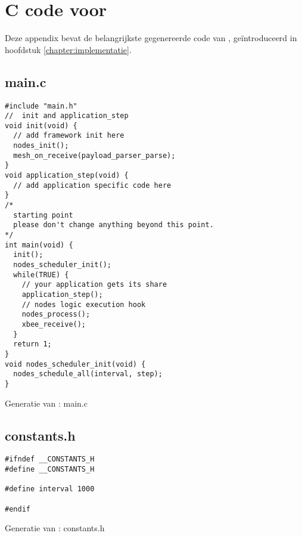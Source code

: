 
\chapter{C code voor }
\label{appendix:hello-srcs}

Deze appendix bevat de belangrijkste gegenereerde code van ,
ge\"introduceerd in hoofdstuk \ref{chapter:implementatie}.

\section{main.c}
\vspace{-5mm}
\begin{listing}[H]
  \begin{verbatim}
#include "main.h"
//  init and application_step
void init(void) {
  // add framework init here
  nodes_init();
  mesh_on_receive(payload_parser_parse);
}
void application_step(void) {
  // add application specific code here
}
/*
  starting point
  please don't change anything beyond this point.
*/
int main(void) {
  init();
  nodes_scheduler_init();
  while(TRUE) {
    // your application gets its share
    application_step();
    // nodes logic execution hook
    nodes_process();
    xbee_receive();
  }
  return 1;
}
void nodes_scheduler_init(void) {
  nodes_schedule_all(interval, step);
}
  \end{verbatim}
  \vspace{-5mm}
  \caption{Generatie van : main.c}
\end{listing}

\section{constants.h}
\vspace{-5mm}
\begin{listing}[H]
  \begin{verbatim}
#ifndef __CONSTANTS_H
#define __CONSTANTS_H

#define interval 1000

#endif
  \end{verbatim}
  \vspace{-5mm}
  \caption{Generatie van : constants.h}
\end{listing}


